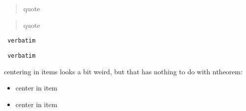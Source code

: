 \documentclass[twoside,11pt]{article}
\theoremstyle{lines}
\theoremstyle{longplain}
\begin{document}
 \begin{Break}[title]
 \begin{quote} quote \end{quote}
 \end{Break}

 \begin{mBreak}[title]
 \begin{quote} quote \end{quote}
 \end{mBreak}

 \begin{Break}[title]
 \begin{verbatim} verbatim \end{verbatim}
 \end{Break}

 \begin{mBreak}[title]
 \begin{verbatim} verbatim \end{verbatim}
 \end{mBreak}

  \noindent
 centering in items looks a bit weird, but that has nothing to do 
  with ntheorem:

 \begin{Break}[title]
 \begin{itemize} \item 
  \begin{center} center in item \end{center}
 \end{itemize}
 \begin{itemize} \item 
  \begin{center} center in item \end{center}
 \end{itemize}
 \end{Break}
\end{document}
